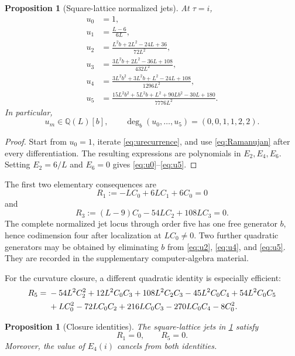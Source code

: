\documentclass[11pt]{article}
\newtheorem{proposition}[theorem]{Proposition}
\theoremstyle{definition}
\theoremstyle{remark}
\newcommand{\Q}{\mathbb{Q}}
\begin{document}
\begin{proposition}[Square-lattice normalized jets]\label{prop:jets}
At \(\tau=i\),
\begin{align}
 u_0&=1,\label{eq:u0}\\
 u_1&=\frac{L-6}{6L},\label{eq:u1}\\
 u_2&=\frac{L^2b+2L^2-24L+36}{72L^2},\label{eq:u2}\\
 u_3&=\frac{3L^2b+2L^2-36L+108}{432L^2},\label{eq:u3}\\
 u_4&=\frac{3L^2b^2+3L^2b+L^2-24L+108}{1296L^2},\label{eq:u4}\\
 u_5&=\frac{15L^2b^2+5L^2b+L^2+90Lb^2-30L+180}{7776L^2}.\label{eq:u5}
\end{align}
In particular,
\begin{equation}\label{eq:jetalgebra}
 u_m\in\Q(L)[b],
 \qquad
 \deg_b(u_0,\ldots,u_5)=(0,0,1,1,2,2).
\end{equation}
\end{proposition}

\begin{proof}
Start from \(u_0=1\), iterate \eqref{eq:urecurrence}, and use \eqref{eq:Ramanujan} after every differentiation. The resulting expressions are polynomials in \(E_2,E_4,E_6\). Setting \(E_2=6/L\) and \(E_6=0\) gives \eqref{eq:u0}--\eqref{eq:u5}.
\end{proof}

The first two elementary consequences are
\begin{equation}\label{eq:R1R3}
 R_1:=-LC_0+6LC_1+6C_0=0
\end{equation}
and
\begin{equation}\label{eq:R3}
 R_3:=(L-9)C_0-54LC_2+108LC_3=0.
\end{equation}
The complete normalized jet locus through order five has one free generator \(b\), hence codimension four after localization at \(LC_0\neq0\). Two further quadratic generators may be obtained by eliminating \(b\) from \eqref{eq:u2}, \eqref{eq:u4}, and \eqref{eq:u5}. They are recorded in the supplementary computer-algebra material.

For the curvature closure, a different quadratic identity is especially efficient:
\begin{align}
 R_5={}&-54L^2C_2^2+12L^2C_0C_3+108L^2C_2C_3
       -45L^2C_0C_4+54L^2C_0C_5\notag\\
 &+LC_0^2-72LC_0C_2+216LC_0C_3-270LC_0C_4-8C_0^2.
 \label{eq:R5}
\end{align}

\begin{proposition}[Closure identities]\label{prop:R1R5}
The square-lattice jets in \cref{prop:jets} satisfy
\begin{equation}\label{eq:R1R5zero}
 R_1=0,
 \qquad
 R_5=0.
\end{equation}
Moreover, the value of \(E_4(i)\) cancels from both identities.
\end{proposition}
\end{document}
